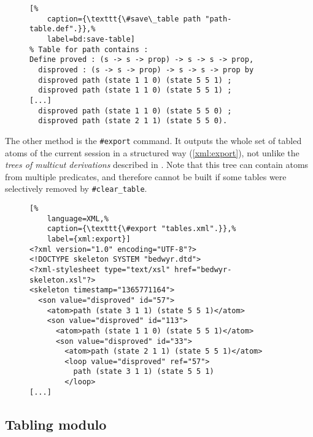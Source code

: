 \begin{figure}[ht]
  \centering
  \begin{lstlisting}[%
    caption={\texttt{\#save\_table path "path-table.def".}},%
    label=bd:save-table]
% Table for path contains :
Define proved : (s -> s -> prop) -> s -> s -> prop,
  disproved : (s -> s -> prop) -> s -> s -> prop by
  disproved path (state 1 1 0) (state 5 5 1) ;
  disproved path (state 1 1 0) (state 5 5 1) ;
[...]
  disproved path (state 1 1 0) (state 5 5 0) ;
  disproved path (state 2 1 1) (state 5 5 0).
  \end{lstlisting}
\end{figure}

The other method is the \lstinline+#export+ command.  It outputs the
whole set of tabled atoms of the current session in a structured way
(\autoref{xml:export}), not unlike the \emph{trees of multicut
derivations} described in \cite{nigam08cie}.  Note that this tree can
contain atoms from multiple predicates, and therefore cannot be built if
some tables were selectively removed by \lstinline{#clear_table}.

\begin{figure}[ht]
  \centering
  \begin{lstlisting}[%
    language=XML,%
    caption={\texttt{\#export "tables.xml".}},%
    label={xml:export}]
<?xml version="1.0" encoding="UTF-8"?>
<!DOCTYPE skeleton SYSTEM "bedwyr.dtd">
<?xml-stylesheet type="text/xsl" href="bedwyr-skeleton.xsl"?>
<skeleton timestamp="1365771164">
  <son value="disproved" id="57">
    <atom>path (state 3 1 1) (state 5 5 1)</atom>
    <son value="disproved" id="113">
      <atom>path (state 1 1 0) (state 5 5 1)</atom>
      <son value="disproved" id="33">
        <atom>path (state 2 1 1) (state 5 5 1)</atom>
        <loop value="disproved" ref="57">
          path (state 3 1 1) (state 5 5 1)
        </loop>
[...]
  \end{lstlisting}
\end{figure}

\subsection{Tabling modulo}


